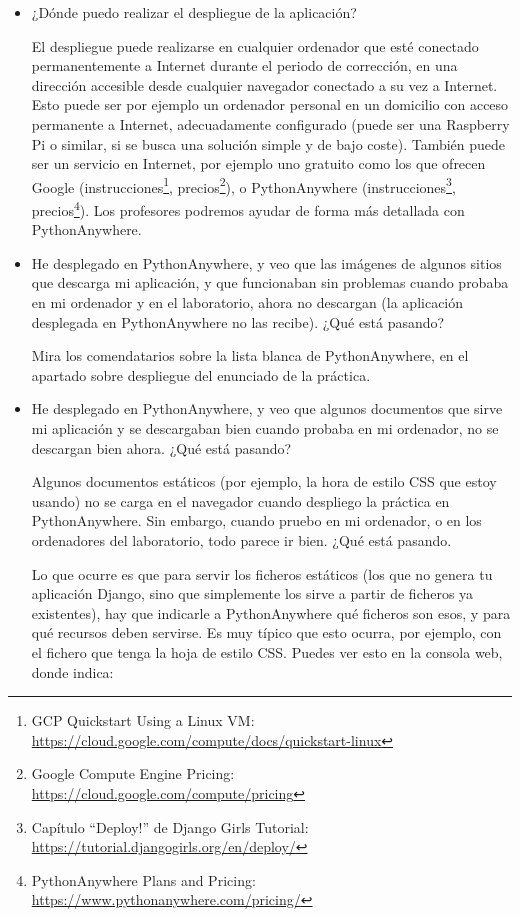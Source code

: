\begin{itemize}
\item ¿Dónde puedo realizar el despliegue de la aplicación?

  El despliegue puede realizarse en cualquier ordenador que esté conectado permanentemente a Internet durante el periodo de corrección, en una dirección accesible desde cualquier navegador conectado a su vez a Internet. Esto puede ser por ejemplo un ordenador personal en un domicilio con acceso permanente a Internet, adecuadamente configurado (puede ser una Raspberry Pi o similar, si se busca una solución simple y de bajo coste). También puede ser un servicio en Internet, por ejemplo uno gratuito como los que ofrecen Google (instrucciones\footnote{GCP Quickstart Using a Linux VM:\\ \url{https://cloud.google.com/compute/docs/quickstart-linux}}, precios\footnote{Google Compute Engine Pricing:\\ \url{https://cloud.google.com/compute/pricing}}), o PythonAnywhere (instrucciones\footnote{Capítulo ``Deploy!'' de Django Girls Tutorial:\\ \url{https://tutorial.djangogirls.org/en/deploy/}}, precios\footnote{PythonAnywhere Plans and Pricing:\\ \url{https://www.pythonanywhere.com/pricing/}}). Los profesores podremos ayudar de forma más detallada con PythonAnywhere.

\item He desplegado en PythonAnywhere, y veo que las imágenes de algunos sitios que descarga mi aplicación, y que funcionaban sin problemas cuando probaba en mi ordenador y en el laboratorio, ahora no descargan (la aplicación desplegada en PythonAnywhere no las recibe). ¿Qué está pasando?

Mira los comendatarios sobre la lista blanca de PythonAnywhere, en el apartado sobre despliegue del enunciado de la práctica.

\item He desplegado en PythonAnywhere, y veo que algunos documentos que sirve mi aplicación y se descargaban bien cuando probaba en mi ordenador, no se descargan bien ahora. ¿Qué está pasando?

  Algunos documentos estáticos (por ejemplo, la hora de estilo CSS que estoy usando) no se carga en el navegador cuando despliego la práctica en PythonAnywhere. Sin embargo, cuando pruebo en mi ordenador, o en los ordenadores del laboratorio, todo parece ir bien. ¿Qué está pasando.

  Lo que ocurre es que para servir los ficheros estáticos (los que no genera tu aplicación Django, sino que simplemente los sirve a partir de ficheros ya existentes), hay que indicarle a PythonAnywhere qué ficheros son esos, y para qué recursos deben servirse. Es muy típico que esto ocurra, por ejemplo, con el fichero que tenga la hoja de estilo CSS. Puedes ver esto en la consola web, donde indica:


\end{itemize}
